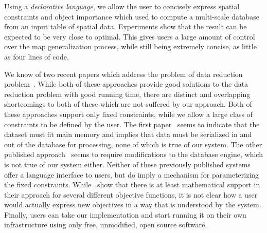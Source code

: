 Using a \emph{declarative language}, we allow the user to concisely express spatial constraints and object importance which used to compute a multi-scale database from an input table of spatial data. Experiments show that the result can be expected to be very close to optimal. This gives users a large amount of control over the map generalization process, while still being extremely concise, as little as four lines of code.

We know of two recent papers which address the problem of data reduction problem~\cite{nutanong2012multiresolution,sarma2012fusiontables}. While both of these approaches provide good solutions to the data reduction problem with good running time, there are distinct and overlapping shortcomings to both of these which are not suffered by our approach.  Both of these approaches support only fixed constraints, while we allow a large class of constraints to be defined by the user. The first paper~\cite{sarma2012fusiontables} seems to indicate that the dataset must fit main memory and implies that data must be serialized in and out of the database for processing, none of which is true of our system. The other published approach~\cite{nutanong2012multiresolution} seems to require modifications to the database engine, which is not true of our system either. Neither of these previously published systems offer a language interface to users, but do imply a mechanism for parameterizing the fixed constraints. While~\cite{sarma2012fusiontables} show that there is at least mathematical support in their approach for several different objective functions, it is not clear how a user would actually express new objectives in a way that is understood by the system. Finally, users can take our implementation and start running it on their own infrastructure using only free, unmodified, open source software.

